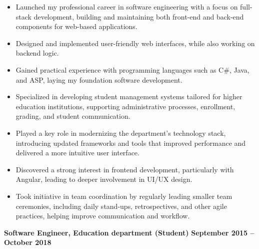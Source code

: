 \documentclass[10pt, a4paper]{cvhari}
\begin{document}
    \vspace{0.2em}
    \begin{itemize}
         
        \item Launched my professional career in software engineering with a focus on full-stack development, building and maintaining both front-end and back-end components for web-based applications.

        \item Designed and implemented user-friendly web interfaces, while also working on backend logic.

        \item Gained practical experience with programming languages such as C\#, Java, and ASP, laying my foundation software development.

        \item Specialized in developing student management systems tailored for higher education institutions, supporting administrative processes, enrollment, grading, and student communication.

        \item Played a key role in modernizing the department’s technology stack, introducing updated frameworks and tools that improved performance and delivered a more intuitive user interface.

        \item Discovered a strong interest in frontend development, particularly with Angular, leading to deeper involvement in UI/UX design.

        \item Took initiative in team coordination by regularly leading smaller team ceremonies, including daily stand-ups, retrospectives, and other agile practices, helping improve communication and workflow.

\end{itemize}

\smallskip
\divider
\smallskip

    \textbf{Software Engineer, Education department (Student)} \hfill \textbf{September 2015 -- October 2018}
\end{document}
